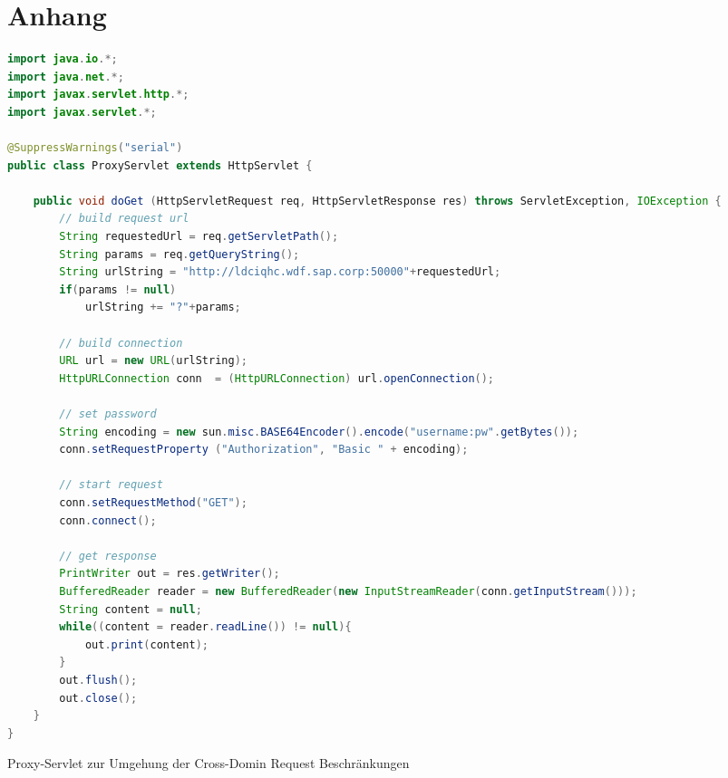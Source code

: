 \setcounter{page}{8}

\chapter{Anhang}

\begin{programm}[h] %
\begin{lstlisting}[language=Java]
import java.io.*;
import java.net.*;
import javax.servlet.http.*;
import javax.servlet.*;

@SuppressWarnings("serial")
public class ProxyServlet extends HttpServlet {

	public void doGet (HttpServletRequest req, HttpServletResponse res) throws ServletException, IOException {
		// build request url
		String requestedUrl = req.getServletPath();
		String params = req.getQueryString();
		String urlString = "http://ldciqhc.wdf.sap.corp:50000"+requestedUrl;
		if(params != null)
			urlString += "?"+params;
		
		// build connection
		URL url = new URL(urlString);
		HttpURLConnection conn  = (HttpURLConnection) url.openConnection();
		
		// set password
		String encoding = new sun.misc.BASE64Encoder().encode("username:pw".getBytes());
		conn.setRequestProperty ("Authorization", "Basic " + encoding);
		
		// start request
		conn.setRequestMethod("GET");
		conn.connect();
		
		// get response
		PrintWriter out = res.getWriter();
		BufferedReader reader = new BufferedReader(new InputStreamReader(conn.getInputStream()));
		String content = null;
		while((content = reader.readLine()) != null){
			out.print(content);
		}
		out.flush();
		out.close();
	}
}
\end{lstlisting}
\caption{Proxy-Servlet zur Umgehung der Cross-Domin Request Beschränkungen\label{listing:servlet}}
\end{programm}

\newpage
\sePrintGlossary{}

\sePrintBibliography{}





\seEhrenwoertlicheErklaerung{}


